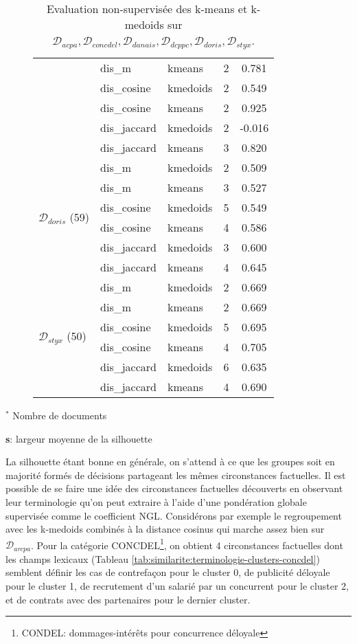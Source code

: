 \begin{table}[!htb]
\begin{subfigure}[ht]{0.49\textwidth}
\begin{tabular}[pos]{|l|l|l|c|c|}
	& dis\_m  & kmeans & 2 & 0.781  \\ \cline{2-5}
	& dis\_cosine & kmedoids & 2 & 0.549 \\ \cline{2-5}
	& dis\_cosine & kmeans & 2 & 0.925 \\ \cline{2-5}
	& dis\_jaccard & kmedoids & 2 & -0.016  \\ \cline{2-5}
	& dis\_jaccard & kmeans & 3 & 0.820 \\ \hline
	\multirow{6}{\mrcell}{$\mathcal{D}_{doris}$ (59)}  & dis\_m & kmedoids & 2 & 0.509  \\ \cline{2-5}
	& dis\_m & kmeans & 3 & 0.527  \\ \cline{2-5}
	& dis\_cosine & kmedoids & 5 & 0.549 \\ \cline{2-5}
	& dis\_cosine & kmeans & 4 & 0.586 \\ \cline{2-5}
	& dis\_jaccard & kmedoids & 3 & 0.600 \\ \cline{2-5}
	& dis\_jaccard & kmeans & 4 & 0.645 
	\\ \hline
	\multirow{6}{\mrcell}{$\mathcal{D}_{styx}$ (50)}  & dis\_m & kmedoids & 2 & 0.669 \\ \cline{2-5}
	& dis\_m & kmeans & 2 & 0.669 \\ \cline{2-5}
	& dis\_cosine & kmedoids & 5 & 0.695 \\ \cline{2-5}
	& dis\_cosine & kmeans & 4 & 0.705 \\ \cline{2-5}
	& dis\_jaccard & kmedoids & 6 & 0.635 \\ \cline{2-5}
	& dis\_jaccard  & kmeans & 4 & 0.690 \\ \hline
	\end{tabular}
	\end{subfigure}

	$^*$ Nombre de documents
	
	\textbf{s}: largeur moyenne de la silhouette

	\caption{Evaluation non-supervisée des k-means et k-medoids sur $\mathcal{D}_{acpa}, \mathcal{D}_{concdel}, \mathcal{D}_{danais}, \mathcal{D}_{dcppc}, \mathcal{D}_{doris}, \mathcal{D}_{styx}$.} \label{tab:similarite:validation-nonsupervisee}
\end{table}

La silhouette étant bonne en générale, on s'attend à ce que les groupes soit en majorité formés de décisions partageant les mêmes circonstances factuelles. Il est possible de se faire une idée des circonstances factuelles découverts en observant leur terminologie qu'on peut extraire à l'aide d'une pondération globale supervisée comme le coefficient NGL. Considérons par exemple le regroupement avec les k-medoids combinés à la distance cosinus qui marche assez bien sur $\mathcal{D}_{arcpa}$. Pour la catégorie CONCDEL\footnote{CONDEL: dommages-intérêts pour concurrence déloyale}, on obtient 4 circonstances factuelles dont les champs lexicaux (Tableau \ref{tab:similarite:terminologie-clusters-concdel}) semblent définir les cas de contrefaçon pour le cluster 0, de publicité déloyale pour le cluster 1, de recrutement d'un salarié par un concurrent pour le cluster 2, et de contrats avec des partenaires pour le dernier cluster.



